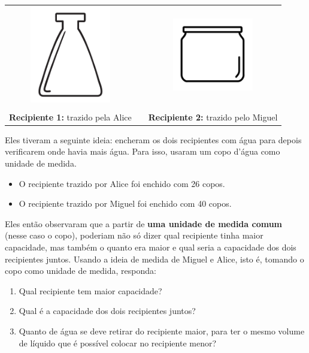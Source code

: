 \documentclass[10 pt,usenames,dvipsnames, oneside]{article}
\begin{document}
\begin{center}
\begin{tabular}{ccc}
\includegraphics[width=100pt, keepaspectratio]{ativ1_fig01.png} &\quad \quad&\includegraphics[width=100pt, keepaspectratio]{ativ1_fig02.png}\\ \\
{\bf Recipiente 1:} trazido pela Alice & & {\bf Recipiente 2:} trazido pelo Miguel
\end{tabular}
\end{center}

Eles tiveram a seguinte ideia: encheram os dois recipientes com água para depois verificarem onde havia mais água. Para isso, usaram um copo d'água como unidade de medida.
\begin{itemize}
 \item O recipiente trazido por Alice foi enchido com 26 copos.
 \item O recipiente trazido por Miguel foi enchido com 40 copos.
\end{itemize}
Eles então observaram que a partir de {\bf uma unidade de medida comum} (nesse caso o copo), poderiam não só dizer qual recipiente tinha maior capacidade, mas também o quanto era maior e qual seria a capacidade dos dois recipientes juntos.
Usando a ideia de medida de Miguel e Alice, isto é, tomando o copo como unidade de medida, responda:
  \begin{enumerate}
   \item Qual recipiente tem maior capacidade?
   \item Qual é a capacidade dos dois recipientes juntos?
   \item Quanto de água se deve retirar do recipiente maior, para ter o mesmo volume de líquido que é possível colocar no recipiente menor?
  \end{enumerate}
\end{document}
